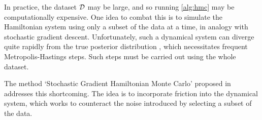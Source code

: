 In practice, the dataset $\mathcal{D}$ may be large, and so running \cref{alg:hmc} may be computationally expensive. One idea to combat this is to simulate the Hamiltonian system using only a subset of the data at a time, in analogy with stochastic gradient descent. Unfortunately, such a dynamical system can diverge quite rapidly from the true posterior distribution \cite{neal-hmc}, which necessitates frequent Metropolis-Hastings steps. Such steps must be carried out using the whole dataset.

The method `Stochastic Gradient Hamiltonian Monte Carlo' proposed in \cite{sghmc} addresses this shortcoming. The idea is to incorporate friction into the dynamical system, which works to counteract the noise introduced by selecting a subset of the data.